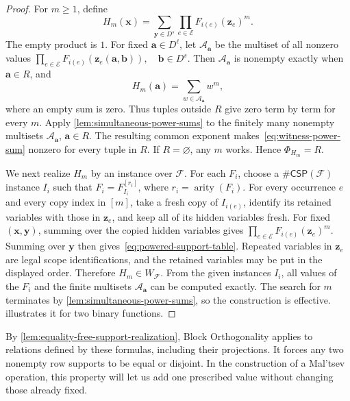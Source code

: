 \documentclass[11pt,letterpaper,onecolumn]{article}
\theoremstyle{plain}
\theoremstyle{definition}
\theoremstyle{remark}
\newcommand{\cF}{\mathcal F}
\newcommand{\CSP}[1]{\mathsf{\#CSP}(#1)}
\newcommand{\SuppRel}[1]{\Phi_{#1}}
\DeclareMathOperator{\arity}{arity}
\begin{document}
\begin{proof}
For $m\ge1$, define
\begin{equation}
  H_m(\mathbf x)
  =\sum_{\mathbf y\in D^s}
       \prod_{e\in\mathcal E}F_{i(e)}(\mathbf z_e)^m.
  \label{eq:powered-support-table}
\end{equation}
The empty product is $1$.  For fixed $\mathbf a\in D^\ell$, let
$\mathcal A_{\mathbf a}$ be the multiset of all nonzero values $\prod_{e\in\mathcal E} F_{i(e)}(\mathbf z_e(\mathbf a,\mathbf b)), \quad \mathbf b\in D^s$. Then $\mathcal A_{\mathbf a}$ is nonempty exactly when $\mathbf a\in R$,
and
\begin{equation}
  H_m(\mathbf a)=\sum_{w\in\mathcal A_{\mathbf a}}w^m,
  \label{eq:witness-power-sum}
\end{equation}
where an empty sum is zero.  Thus tuples outside $R$ give zero term by term
for every $m$.  Apply \cref{lem:simultaneous-power-sums} to the finitely many
nonempty multisets $\mathcal A_{\mathbf a}$, $\mathbf a\in R$.  The resulting
common exponent makes~\eqref{eq:witness-power-sum} nonzero for every tuple in
$R$.  If $R=\varnothing$, any $m$ works.  Hence $\SuppRel{H_m}=R$.

We next realize $H_m$ by an instance over $\cF$.  For each $F_i$, choose a $\CSP{\cF}$ instance $I_i$ such
that $F_i=F_{I_i}^{[r_i]}$, where $r_i=\arity(F_i)$.  For every
occurrence $e$ and every
copy index in $[m]$, take a fresh copy of $I_{i(e)}$, identify its
retained variables with those in $\mathbf z_e$, and keep all of
its hidden variables fresh.  For fixed $(\mathbf x,\mathbf y)$,
summing over the copied hidden variables gives $\prod_{e\in\mathcal E}F_{i(e)}(\mathbf z_e)^m$. Summing over $\mathbf y$ then gives~\eqref{eq:powered-support-table}.
Repeated variables in $\mathbf z_e$ are legal scope identifications, and the
retained variables may be put in the displayed order.  Therefore
$H_m\in W_{\cF}$.
From the given instances $I_i$, all values of the $F_i$ and the finite
multisets $\mathcal A_{\mathbf a}$ can be computed exactly.
The search for $m$ terminates by \cref{lem:simultaneous-power-sums},
so the construction is effective.
 illustrates it for two binary
functions.
\end{proof}

By \cref{lem:equality-free-support-realization}, Block Orthogonality
applies to relations defined by these formulas, including their
projections.  It forces any two nonempty row supports to be equal or
disjoint.  In the construction of a Mal'tsev operation, this property
will let us add one prescribed value without changing those already fixed.
\end{document}
